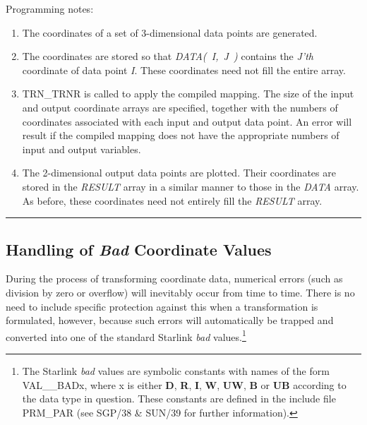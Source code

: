 \documentclass[twoside,11pt]{article}
\newcommand{\xref}[3]{#1}
\newcommand{\xlabel}[1]{}
\newcommand{\name}[1]{\mbox{\small{#1}}}
\newcommand{\fortvar}[1]{\mbox{\emph{#1}}}
\newcommand{\exampledone}[0]{\begin{center} \rule{6em}{0.2mm} \end{center}}
\begin{document}
Programming notes:

\begin{enumerate}

\item The coordinates of a set of 3-dimensional data points are generated.

\item The coordinates are stored so that \fortvar{DATA( I, J )} contains the
\fortvar{J'th} coordinate of data point \fortvar{I}. 
These coordinates need not fill the entire array.

\item \name{TRN\_TRNR} is called to apply the compiled mapping.
The size of the input and output coordinate arrays are specified, together
with the numbers of coordinates associated with each input and output data
point. 
An error will result if the compiled mapping does not have the appropriate
numbers of input and output variables. 

\item The 2-dimensional output data points are plotted.
Their coordinates are stored in the \fortvar{RESULT} array in a similar
manner to those in the \fortvar{DATA} array. 
As before, these coordinates need not entirely fill the \fortvar{RESULT}
array. 

\end{enumerate}
\exampledone


\subsection{\xlabel{handling_of_bad_coordinate_values}Handling of \emph{Bad} Coordinate Values}

\label{section:additional:badvalues}

During the process of transforming coordinate data, numerical errors (such
as division by zero or overflow) will inevitably occur from time to time. 
There is no need to include specific protection against this when a
transformation is formulated, however, because such errors will
automatically be trapped and converted into one of the standard Starlink
{\em bad} values.\footnote{ 
The Starlink \emph{bad} values are symbolic constants with names of the form
\name{VAL\_\_BADx}, where x is either \textbf{D}, \textbf{R}, \textbf{I}, 
\textbf{W}, \textbf{UW}, \textbf{B} or \textbf{UB} according to the data 
type in question. 
These constants are defined in the include file \name{PRM\_PAR} (see 
\xref{SGP/38}{sgp38}{}
\& \xref{SUN/39}{sun39}{} for further information).} 
\end{document}

